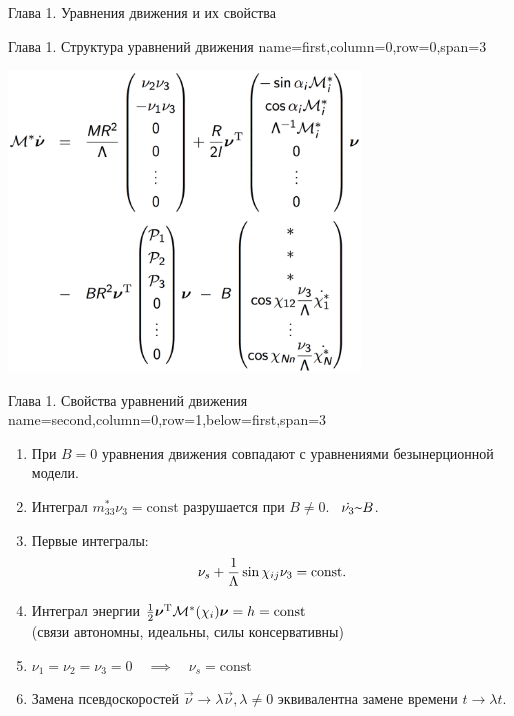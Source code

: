 \begin{myposter}{
    Глава 1. Уравнения движения и их свойства 
}

    \headerbox
    {Глава 1. Структура уравнений движения}
    {name=first,column=0,row=0,span=3}
    {
        \begin{center}
            {\huge\bf
                \vspace{10pt}
                \centering
                \includegraphics[width=0.7\textwidth]{content/pic/asypng/eq_struct.png}
                \vspace{10pt}
            }
        \end{center}
    }
    
    \headerbox
    {Глава 1. Свойства уравнений движения}
    {name=second,column=0,row=1,below=first,span=3}
    {
        {\huge\bf
            \vspace{10pt}
            \begin{enumerate}
                \item При $B = 0$ уравнения движения совпадают с уравнениями безынерционной модели.
                \item Интеграл $m_{33}^*\nu_3 = \mathrm{const}$ разрушается при $B \neq 0$. \ $\dot{\nu_3} \textprop B$.
                \item Первые интегралы:
                $$\nu_s + \displaystyle\frac{\displaystyle 1}{\displaystyle \Lambda}\sin\chi_{ij}\nu_3 = \mathrm{const}.$$
                \item Интеграл энергии \quad $\frac{1}{2}\boldsymbol{\mathbf{\nu}}^\mathrm{T}\mathcal{M}^*(\chi_i)\boldsymbol{\mathbf{\nu}} = h = \mathrm{const}$\\
                (связи автономны, идеальны, силы консервативны)
                \item $\nu_1 = \nu_2 = \nu_3 = 0 \quad \implies \quad \nu_s = \mathrm{const}$
                \item Замена псевдоскоростей $\vec{\nu} \rightarrow \lambda\vec{\nu}, \lambda \neq 0$ эквивалентна замене времени $t \rightarrow \lambda t$.
            \end{enumerate}
            \vspace{10pt}
        }
    }

\end{myposter}
